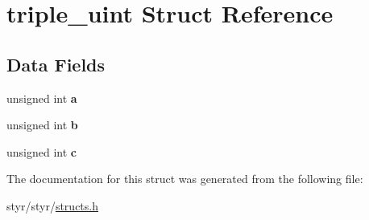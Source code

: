 \hypertarget{structtriple__uint}{}\section{triple\+\_\+uint Struct Reference}
\label{structtriple__uint}
\subsection*{Data Fields}
\begin{DoxyCompactItemize}
\item 
unsigned int {\bfseries a}\hypertarget{structtriple__uint_a0ea8a85723620c90be9fd2a693f12a59}{}\label{structtriple__uint_a0ea8a85723620c90be9fd2a693f12a59}

\item 
unsigned int {\bfseries b}\hypertarget{structtriple__uint_a790d5baa17ec7aaf7bb49750a16e9c29}{}\label{structtriple__uint_a790d5baa17ec7aaf7bb49750a16e9c29}

\item 
unsigned int {\bfseries c}\hypertarget{structtriple__uint_a6ce17b018c47d0f1d0e53a458f741ad3}{}\label{structtriple__uint_a6ce17b018c47d0f1d0e53a458f741ad3}

\end{DoxyCompactItemize}


The documentation for this struct was generated from the following file\+:\begin{DoxyCompactItemize}
\item 
styr/styr/\hyperlink{structs_8h}{structs.\+h}\end{DoxyCompactItemize}
